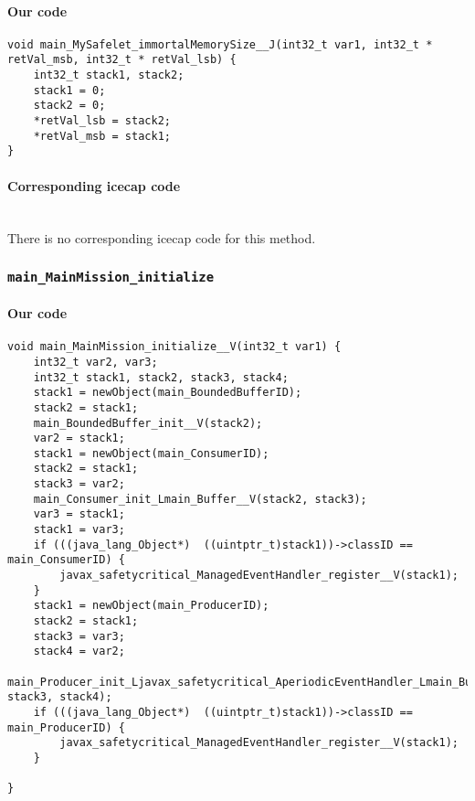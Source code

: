 \paragraph{Our code}\hfill
\begin{lstlisting}[firstnumber=2477]
void main_MySafelet_immortalMemorySize__J(int32_t var1, int32_t * retVal_msb, int32_t * retVal_lsb) {
	int32_t stack1, stack2;
	stack1 = 0;
	stack2 = 0;
	*retVal_lsb = stack2;
	*retVal_msb = stack1;
}
\end{lstlisting}

\paragraph{Corresponding icecap code}\hfill\\
There is no corresponding icecap code for this method.


\subsubsection{\texttt{main\_MainMission\_initialize}}

\paragraph{Our code}\hfill
\begin{lstlisting}[firstnumber=2505]
void main_MainMission_initialize__V(int32_t var1) {
	int32_t var2, var3;
	int32_t stack1, stack2, stack3, stack4;
	stack1 = newObject(main_BoundedBufferID);
	stack2 = stack1;
	main_BoundedBuffer_init__V(stack2);
	var2 = stack1;
	stack1 = newObject(main_ConsumerID);
	stack2 = stack1;
	stack3 = var2;
	main_Consumer_init_Lmain_Buffer__V(stack2, stack3);
	var3 = stack1;
	stack1 = var3;
	if (((java_lang_Object*)  ((uintptr_t)stack1))->classID == main_ConsumerID) {
		javax_safetycritical_ManagedEventHandler_register__V(stack1);
	}
	stack1 = newObject(main_ProducerID);
	stack2 = stack1;
	stack3 = var3;
	stack4 = var2;
	main_Producer_init_Ljavax_safetycritical_AperiodicEventHandler_Lmain_Buffer__V(stack2, stack3, stack4);
	if (((java_lang_Object*)  ((uintptr_t)stack1))->classID == main_ProducerID) {
		javax_safetycritical_ManagedEventHandler_register__V(stack1);
	}

}
\end{lstlisting}

